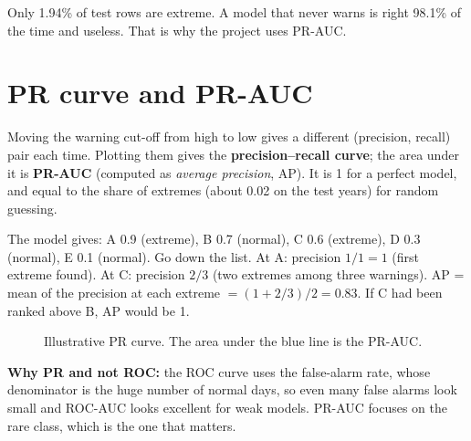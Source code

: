 \begin{keyidea}
Only 1.94\% of test rows are extreme. A model that never warns is right 98.1\% of the time and useless. That is why
the project uses PR-AUC.
\end{keyidea}

\section{PR curve and PR-AUC}
Moving the warning cut-off from high to low gives a different (precision, recall) pair each time. Plotting them gives
the \textbf{precision--recall curve}; the area under it is \textbf{PR-AUC} (computed as \emph{average precision}, AP).
It is 1 for a perfect model, and equal to the share of extremes (about 0.02 on the test years) for random guessing.

\begin{example}
The model gives: A 0.9 (extreme), B 0.7 (normal), C 0.6 (extreme), D 0.3 (normal), E 0.1 (normal).
Go down the list. At A: precision $1/1=1$ (first extreme found). At C: precision $2/3$ (two extremes among three
warnings). AP = mean of the precision at each extreme $=(1+2/3)/2=0.83$. If C had been ranked above B, AP would be 1.
\end{example}

\begin{figure}[H]
\centering
{}
\caption{Illustrative PR curve. The area under the blue line is the PR-AUC.}
\end{figure}

\textbf{Why PR and not ROC:} the ROC curve uses the false-alarm rate, whose denominator is the huge number of normal
days, so even many false alarms look small and ROC-AUC looks excellent for weak models. PR-AUC focuses on the rare
class, which is the one that matters.

